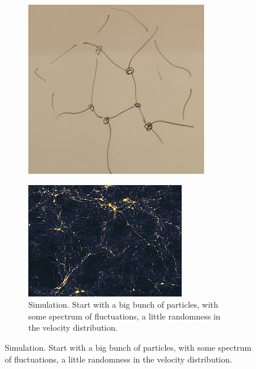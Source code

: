 \documentclass[]{article}
\begin{document}
\begin{figure}[H]
\begin{subfigure}[t]{0.45\textwidth}
		\includegraphics[width=\textwidth]{cosmo-9-web}
	\end{subfigure}
	\begin{subfigure}[b]{0.45\textwidth}
		\caption{Simulation. Start with a big bunch of particles, with some spectrum of fluctuations, a little randomness in the velocity distribution.\cite{pontzen2014computer}}\label{fig:cosmo-9-simulation}
		\includegraphics[width=\textwidth]{Large-scale_structure_of_light_distribution_in_the_universe}
	\end{subfigure}

\end{figure}
\end{document}
